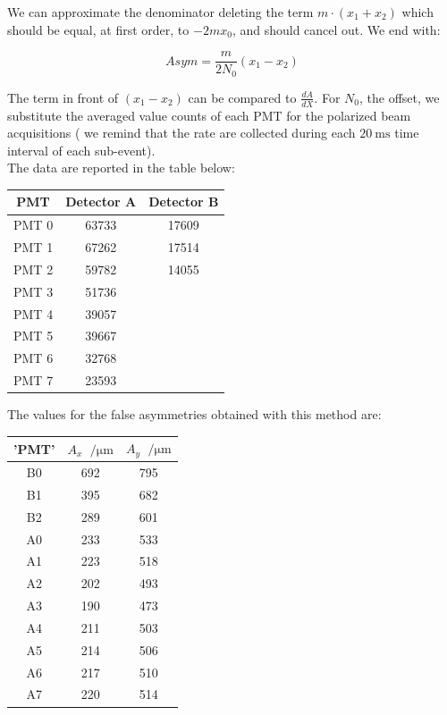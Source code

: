 We can approximate the denominator deleting the term $ m \cdot (x_{1} +  x_{2})$ which should be equal, at first order, to $- 2m x_{0}$, and should cancel out. We end with:

\begin{equation}
Asym = \dfrac{m}{2N_{0}}(x_{1} -  x_{2})
\end{equation}

The term in front of $(x_{1} - x_{2})$ can be compared to $\frac{dA}{dX}$. For $N_{0}$, the offset, we substitute the averaged value counts of each PMT for the polarized beam acquisitions ( we remind that the rate are collected during each $\SI{20}{\milli \second}$ time interval of each sub-event).\\
The data are reported in the table below:

\begin{center}
\begin{tabular}{|c|c|c|}
\hline 
PMT & Detector A & Detector B \\ 
\hline
PMT 0 & 63733 & 17609 \\ 
PMT 1 & 67262 & 17514 \\ 
PMT 2 & 59782 & 14055 \\ 
PMT 3 & 51736 & \\ 
PMT 4 & 39057 & \\ 
PMT 5 & 39667 & \\ 
PMT 6 & 32768 & \\ 
PMT 7 & 23593 & \\ 
\hline 
\end{tabular} 
\end{center}
 
The values for the false asymmetries obtained with this method are:

\begin{table}[h]
\centering
\begin{tabular}{c|c|c}
\hline
 'PMT' & $A_{x}$ $\SI{}{\per \micro \meter}$&   $A_{y}$ $\SI{}{\per \micro \meter}$ \\
\hline
 B0 & 692 & 795 \\
 B1 & 395 & 682 \\
 B2 & 289 & 601 \\
 A0 & 233 & 533 \\
 A1 & 223 & 518 \\
 A2 & 202 & 493 \\
 A3 & 190 & 473 \\
 A4 & 211 & 503 \\
 A5 & 214 & 506 \\
 A6 & 217 & 510 \\
 A7 & 220 & 514 \\
\hline
\end{tabular}
\end{table}

